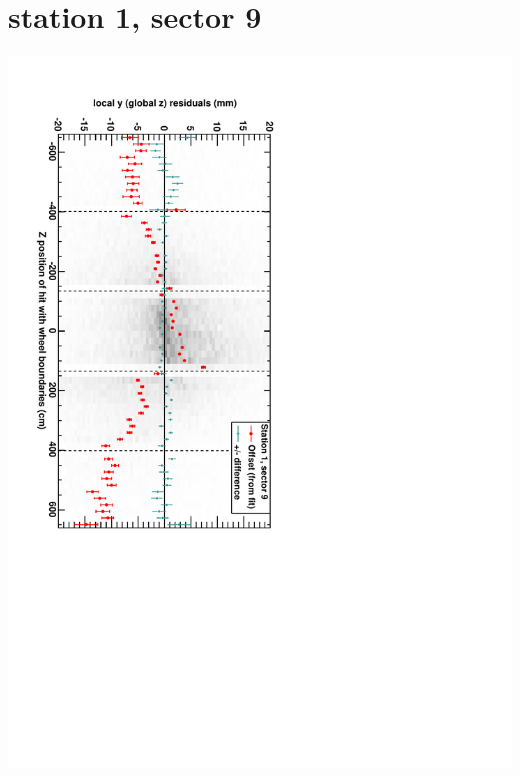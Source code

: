 \documentclass[compress]{beamer}
\begin{document}
\section*{station 1, sector 9}
\begin{frame} \vfill \mbox{\hspace{-1 cm}\includegraphics[height=1.2\linewidth, angle=90]{DTzVsZ_st1_sr09.pdf}} \end{frame}
\end{document}
